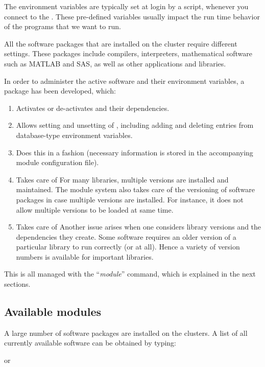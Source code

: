The environment variables are typically set at login by a script, whenever you
connect to the \hpc. These pre-defined variables usually impact the run time
behavior of the programs that we want to run.

All the software packages that are installed on the \hpc cluster require
different settings. These packages include compilers, interpreters,
mathematical software such as MATLAB and SAS, as well as other applications and
libraries.

In order to administer the active software and their environment variables, a
 package has been developed, which:

\begin{enumerate}
\item  Activates or de-activates  and their dependencies.
\item  Allows setting and unsetting of , including adding and deleting entries from database-type environment variables.
\item  Does this in a  fashion (necessary information is stored in the accompanying module configuration file).
\item  Takes care of  For many libraries, multiple versions are installed and maintained. The module system also takes care of the versioning of software packages in case multiple versions are installed. For instance, it does not allow multiple versions to be loaded at same time.
\item  Takes care of  Another issue arises when one considers library versions and the dependencies they create. Some software requires an older version of a particular library to run correctly (or at all). Hence a variety of version numbers is available for important libraries.
\end{enumerate}

This is all managed with the ``\emph{module}'' command, which is explained in the next sections.

\subsection{Available modules}

A large number of software packages are installed on the \hpc clusters. A
list of all currently available software can be obtained by typing:

\begin{prompt}
\end{prompt}
or
\begin{prompt}
\end{prompt}

